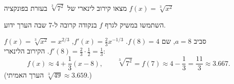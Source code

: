 
\begin{question}
מצאו קירוב לינארי של $\sqrt[3]{7^2}$ בעזרת בפונקציה $f(x)=\sqrt[3]{x^2}$
\end{question}

\begin{hint}
השתמשו במשיק לגרף $f$ בנקודה קרובה ל-$7$ שבה הערך ידוע.
\end{hint}

\begin{solution}
$f(x)=\sqrt[3]{x^2}=x^{2/3}$ סביב $a=8$, שם $f(8)=4$. $f'(x)=\frac23x^{-1/3}$, $f'(8)=\frac23\cdot\frac12=\frac13$. הקירוב הלינארי:
\[ f(x)\approx4+\frac13(x-8), \qquad \sqrt[3]{7^2}=f(7)\approx4-\frac13=\boxed{\frac{11}{3}\approx3.667}. \]
(הערך האמיתי $\sqrt[3]{49}\approx3.659$.)
\end{solution}
